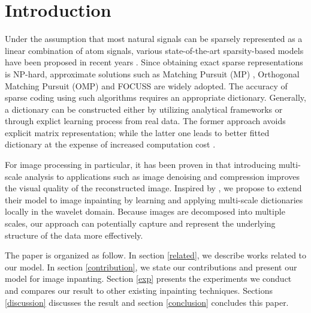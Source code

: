 \documentclass[conference]{IEEEtran}
\begin{document}

%
\IEEEpeerreviewmaketitle

\section{Introduction}
Under the assumption that most natural signals can be sparsely represented as a linear combination of atom signals, various state-of-the-art sparsity-based models have been proposed in recent years \cite{elad09}. Since obtaining exact sparse representations is NP-hard, approximate solutions such as Matching Pursuit (MP) \cite{mallat}, Orthogonal Matching Pursuit (OMP) \cite{pati} and FOCUSS \cite{focuss} are widely adopted. The accuracy of sparse coding using such algorithms requires an appropriate dictionary. Generally, a dictionary can be constructed either by utilizing  analytical frameworks or through explict learning process from real data. The former approach avoids explicit matrix representation; while the latter one leads to better fitted dictionary at the expense of increased computation cost \cite{multiscaleDictLearning}. 

 For image processing in particular, it has been proven in \cite{husoy} that introducing multi-scale analysis to applications such as image denoising and compression improves the visual quality of the reconstructed image. Inspired by \cite{multiscaleDictLearning}, we propose to extend their model to image inpainting by learning and applying multi-scale dictionaries locally in the wavelet domain. Because images are decomposed into multiple scales, our approach can potentially capture and represent the underlying structure of the data more effectively.

The paper is organized as follow. In section \ref{related}, we describe works related to our model. In section \ref{contribution}, we state our contributions and present our model for image inpanting. Section \ref{exp} presents the experiments we conduct and compares our result to other existing inpainting techniques. Sections \ref{discussion} discusses the result and section \ref{conclusion} concludes this paper.
\end{document}
